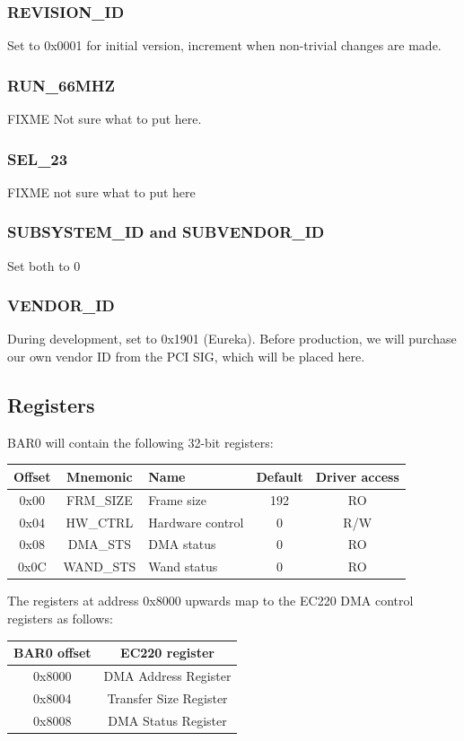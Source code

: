 \documentclass[12pt]{article}
\begin{document}
\subsubsection{REVISION\_ID}
Set to 0x0001 for initial version, increment when non-trivial changes are made.

\subsubsection{RUN\_66MHZ}
FIXME Not sure what to put here.

\subsubsection{SEL\_23}
FIXME not sure what to put here

\subsubsection{SUBSYSTEM\_ID and SUBVENDOR\_ID}
Set both to 0

\subsubsection{VENDOR\_ID}
During development, set to 0x1901 (Eureka). Before production, we will purchase our own vendor ID from the PCI SIG, which will be placed here.

\subsection{Registers}

BAR0 will contain the following 32-bit registers:

\begin{tabular}{|c|c|l|c|c|} \hline
\textbf{Offset} & \textbf{Mnemonic} & \textbf{Name} & \textbf{Default} & \textbf{Driver access} \\ \hline
0x00 & FRM\_SIZE & Frame size & 192 & RO \\ \hline
0x04 & HW\_CTRL & Hardware control & 0 & R/W \\ \hline
0x08 & DMA\_STS & DMA status & 0 & RO \\ \hline
0x0C & WAND\_STS & Wand status & 0 & RO \\ \hline
\end{tabular}

The registers at address 0x8000 upwards map to the EC220 DMA control registers
as follows:

\begin{tabular}{|c|c|} \hline
\textbf{BAR0 offset} & \textbf{EC220 register} \\ \hline
0x8000 & DMA Address Register \\ \hline
0x8004 & Transfer Size Register \\ \hline
0x8008 & DMA Status Register \\ \hline
\end{tabular}
\end{document}
